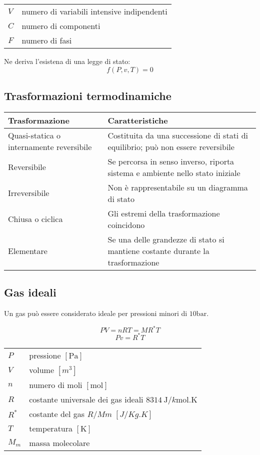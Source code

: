 \begin{tabular}{ll}
    $V$ & numero di variabili intensive indipendenti \\
    $C$ & numero di componenti \\
    $F$ & numero di fasi \\
\end{tabular}

Ne deriva l'esistena di una legge di stato:
\[f(P, v, T) = 0\]

\subsection{Trasformazioni termodinamiche}
\begin{tabular}{p{3.1cm}p{4cm}}
    \toprule
    Trasformazione & Caratteristiche \\
    \midrule
    Quasi-statica o \newline internamente reversibile & Costituita da una successione di stati di equilibrio; può non essere reversibile \\
    Reversibile & Se percorsa in senso inverso, riporta sistema e ambiente nello stato iniziale \\
    Irreversibile & Non è rappresentabile su un diagramma di stato \\
    Chiusa o ciclica & Gli estremi della trasformazione coincidono \\
    Elementare & Se una delle grandezze di stato si mantiene costante durante la trasformazione \\
    \bottomrule
\end{tabular}

\subsection{Gas ideali}
Un gas può essere considerato ideale per pressioni minori di $\si{10\bar}$.

\[PV = nRT = MR^*T\]
\[Pv = R^*T \]
\begin{tabular}{ll}
    $P$ & pressione $[\si{\pascal}]$ \\
    $V$ & volume $[\si{m^3}]$ \\
    $n$ & numero di moli $[\si{\mol}]$ \\
    $R$ & costante universale dei gas ideali $\SI{8314}{\J/k\mol.\K}$ \\
    $R^*$ & costante del gas $R/Mm \; [\si{J/Kg.K}]$ \\
    $T$ & temperatura $[\si{\K}]$ \\
    $M_m$ & massa molecolare \\
\end{tabular}

